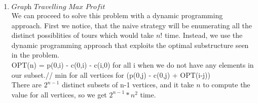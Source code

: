 \documentclass[]{report}
\begin{document}
\begin{enumerate}
																			
	
	
	
	
	
	
	
	\item $ \textit{Graph Travelling Max Profit} $  \\ 
	
	We can proceed to solve this problem with a dynamic programming approach. First we notice, that the naive strategy will be enumerating all the distinct possiblities of tours which would take $ n! $ time. Instead, we use the dynamic programming approach that exploits the optimal substructure seen in the problem.  \\
	
	OPT(n) = p(0,i) - c(0,i) - c(i,0) for all i when we do not have any elements in our subset.//
	min for all vertices for (p(0,j) - c(0,j)  + OPT(i-j)) \\
	
	There are $2^{n-1}$ distinct subsets of n-1 vertices, and it take $ n $ to compute the value for all vertices, so we get $ 2^{n-1}*n^{2} $ time. 
	
	 
	
	
	
	
	
	

	
	
	
	

	
	
\end{enumerate}
\end{document}
